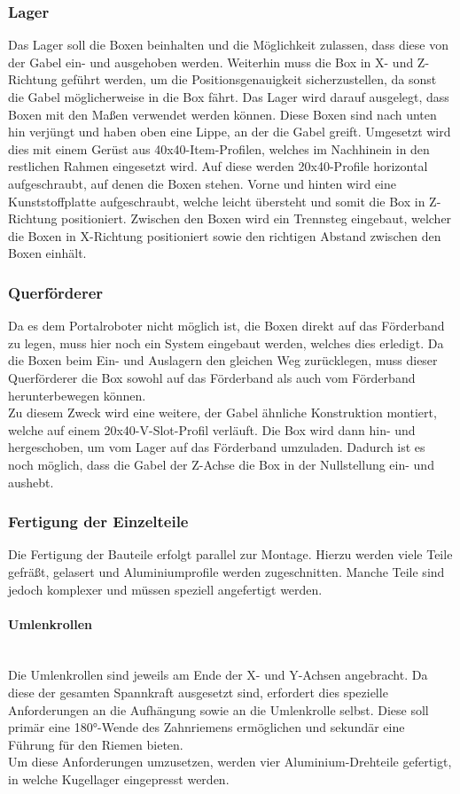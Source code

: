 \subsubsection{Lager}
Das Lager soll die Boxen beinhalten und die Möglichkeit zulassen, dass diese von der Gabel ein- und ausgehoben werden. Weiterhin muss die Box in X- und Z-Richtung geführt werden, um die Positionsgenauigkeit sicherzustellen, da sonst die Gabel möglicherweise in die Box fährt. Das Lager wird darauf ausgelegt, dass Boxen mit den Maßen  verwendet werden können. Diese Boxen sind nach unten hin verjüngt und haben oben eine Lippe, an der die Gabel greift.
Umgesetzt wird dies mit einem Gerüst aus 40x40-Item-Profilen, welches im Nachhinein in den restlichen Rahmen eingesetzt wird. Auf diese werden 20x40-Profile horizontal aufgeschraubt, auf denen die Boxen stehen. Vorne und hinten wird eine Kunststoffplatte aufgeschraubt, welche leicht übersteht und somit die Box in Z-Richtung positioniert. Zwischen den Boxen wird ein Trennsteg eingebaut, welcher die Boxen in X-Richtung positioniert sowie den richtigen Abstand zwischen den Boxen einhält.

\subsubsection{Querförderer}
Da es dem Portalroboter nicht möglich ist, die Boxen direkt auf das Förderband zu legen, muss hier noch ein System eingebaut werden, welches dies erledigt. Da die Boxen beim Ein- und Auslagern den gleichen Weg zurücklegen, muss dieser Querförderer die Box sowohl auf das Förderband als auch vom Förderband herunterbewegen können.\\
Zu diesem Zweck wird eine weitere, der Gabel ähnliche Konstruktion montiert, welche auf einem 20x40-V-Slot-Profil verläuft. Die Box wird dann hin- und hergeschoben, um vom Lager auf das Förderband umzuladen. Dadurch ist es noch möglich, dass die Gabel der Z-Achse die Box in der Nullstellung ein- und aushebt.


\subsubsection{Fertigung der Einzelteile}\nobreak
Die Fertigung der Bauteile erfolgt parallel zur Montage. Hierzu werden viele Teile gefräßt, gelasert und Aluminiumprofile werden zugeschnitten. Manche Teile sind jedoch komplexer und müssen speziell angefertigt werden.

\paragraph{Umlenkrollen}\mbox{}\\
Die Umlenkrollen sind jeweils am Ende der X- und Y-Achsen angebracht. Da diese der gesamten Spannkraft ausgesetzt sind, erfordert dies spezielle Anforderungen an die Aufhängung sowie an die Umlenkrolle selbst. Diese soll primär eine 180°-Wende des Zahnriemens ermöglichen und sekundär eine Führung für den Riemen bieten.\\
Um diese Anforderungen umzusetzen, werden vier Aluminium-Drehteile gefertigt, in welche Kugellager eingepresst werden.

